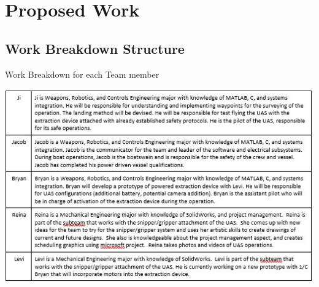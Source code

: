 \documentclass{wrcecapstone}
\begin{document}
\section{Proposed Work}

\subsection{Work Breakdown Structure}
\begin{table}
\caption{Work Breakdown for each Team member}
\label{tab:8.1.1}
\begin{center}
\includegraphics[width=\columnwidth]{figures/table-811.jpg}
\end{center}
\end{table}
\end{document}
